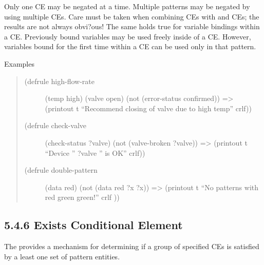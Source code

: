 \documentclass[letterpaper,10pt,english]{sphinxmanual}
\begin{document}
Only one CE may be negated at a time. Multiple patterns may be negated
by using multiple  CEs. Care must be taken when combining 
CEs with  and  CEs; the results are not always obvi?ous!
The same holds true for variable bindings within a  CE.
Previously bound variables may be used freely inside of a  CE.
However, variables bound for the first time within a  CE can be
used only in that pattern.

Examples
\begin{quote}
\begin{description}
\item[{(defrule high-flow-rate}] \leavevmode
(temp high)
(valve open)
(not (error-status confirmed))
=\textgreater{}
(printout t “Recommend closing of valve due to high temp” crlf))

\item[{(defrule check-valve}] \leavevmode
(check-status ?valve)
(not (valve-broken ?valve))
=\textgreater{}
(printout t “Device ” ?valve ” is OK” crlf))

\item[{(defrule double-pattern}] \leavevmode
(data red)
(not (data red ?x ?x))
=\textgreater{}
(printout t “No patterns with red green green!” crlf ))

\end{description}
\end{quote}


\subsection{5.4.6 Exists Conditional Element}
\label{\detokenize{defrule:exists-conditional-element}}
The   provides a mechanism for
determining if a group of specified CEs is satisfied by a least one set
of pattern entities.


\begin{sphinxVerbatim}[commandchars=\\\{\}]
   
\end{sphinxVerbatim}
\end{document}
